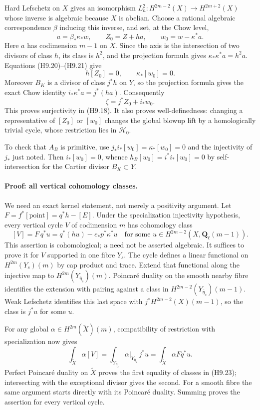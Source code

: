 \documentclass[11pt,a4paper]{article}
\begin{document}
Hard Lefschetz on $X$ gives an isomorphism
$L_h^2:H^{2m-2}(X)\to H^{2m+2}(X)$ whose inverse is algebraic because
$X$ is abelian. Choose a rational algebraic correspondence $\beta$
inducing this inverse, and set, at the Chow level,
\[
 a=\beta_*\kappa_*w,\qquad Z_0=Z+h a,
 \qquad w_0=w-\kappa^*a.                                      \tag{H9.21}
\]
Here $a$ has codimension $m-1$ on $X$. Since the axis is the
intersection of two divisors of class $h$, its class is $h^2$, and the
projection formula gives $\kappa_*\kappa^*a=h^2a$.
Equations (H9.20)--(H9.21) give
\[
 h[Z_0]=0,\qquad \kappa_*[w_0]=0.
\]
Moreover $B_K$ is a divisor of class $j^*h$ on $Y$, so the projection
formula gives the exact Chow identity $i_*\kappa^*a=j^*(h a)$.
Consequently
\[
 \zeta=j^*Z_0+i_*w_0.                                         \tag{H9.22}
\]
This proves surjectivity in (H9.18). It also proves well-definedness:
changing a representative of $[Z_0]$ or $[w_0]$ changes the global
blowup lift by a homologically trivial cycle, whose restriction lies
in $\mathcal H_0$.

To check that $A_B$ is primitive, use
$j_*i_*[w_0]=\kappa_*[w_0]=0$ and the injectivity of $j_*$ just noted.
Then $i_*[w_0]=0$, whence
$h_B[w_0]=i^*i_*[w_0]=0$ by self-intersection for the Cartier divisor
$B_K\subset Y$.

\paragraph{Proof: all vertical cohomology classes.}
We need an exact kernel statement, not merely a positivity argument.
Let $F=f^*[\mathrm{point}]=q^*h-[E]$. Under the specialization
injectivity hypothesis, every vertical cycle $V$ of codimension $m$
has cohomology class
\[
 [V]=F\,q^*u=q^*(h u)-e_*p^*\kappa^*u
 \quad\text{for some }u\in H^{2m-2}(X,\mathbf Q_\ell(m-1)).     \tag{H9.23}
\]
This assertion is cohomological; $u$ need not be asserted algebraic.
It suffices to prove it for $V$ supported in one fibre $Y_s$.
The cycle defines a linear functional on $H^{2m}(Y_s)(m)$ by cap
product and trace. Extend that functional along the injective map to
$H^{2m}(Y_{\bar\eta_s})(m)$. Poincar\'e duality on the smooth nearby
fibre identifies the extension with pairing against a class in
$H^{2m-2}(Y_{\bar\eta_s})(m-1)$. Weak Lefschetz identifies this last
space with $j^*H^{2m-2}(X)(m-1)$, so the class is $j^*u$ for some $u$.

For any global $\alpha\in H^{2m}(\widetilde X)(m)$, compatibility of
restriction with specialization now gives
\[
 \int_{\widetilde X}\alpha[V]
   =\int_{Y_{\bar\eta_s}}\alpha|_{Y_{\bar\eta_s}}\,j^*u
   =\int_{\widetilde X}\alpha Fq^*u.
\]
Perfect Poincar\'e duality on $\widetilde X$ proves the first equality
of classes in (H9.23); intersecting with the exceptional divisor gives
the second. For a smooth fibre the same argument starts directly with
its Poincar\'e duality. Summing proves the assertion for every vertical
cycle.
\end{document}
